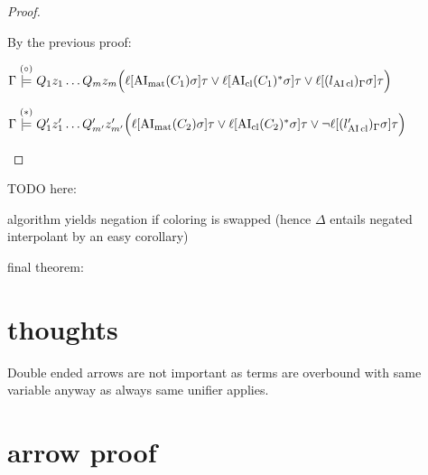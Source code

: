 \documentclass[,%
	paper=a4,%
	DIV12, %
	twoside=false,%
	liststotoc,
	bibtotoc,
	draft=false,%
	numbers=noendperiod
]{scrartcl}
\begin{document}
\begin{proof}
\begin{description}
			\clearpage
			By the previous proof:

			$\Gamma \stackrel{(\circ)}{\models} Q_1 z_1 \dots Q_m z_m \Big(\ell[\operatorname{AI}_\mathrm{mat}(C_1)\sigma]\tau \lor \ell[\operatorname{AI}_\mathrm{cl}(C_1)^*\sigma]\tau \lor \ell[(l{_{\operatorname{AI}\mathrm{cl}}})_\Gamma\sigma]\tau \Big)$

	$\Gamma \stackrel{(*)}{\models} Q_1' z_1' \dots Q_{m'}' z_{m'}' \Big(  \ell[\operatorname{AI}_\mathrm{mat}(C_2)\sigma]\tau \lor \ell[\operatorname{AI}_\mathrm{cl}(C_2)^*\sigma]\tau \lor \lnot \ell[(l{_{\operatorname{AI}\mathrm{cl}}'})_\Gamma\sigma]\tau \Big)$

	\end{description}
\end{proof}

TODO here:

algorithm yields negation if coloring is swapped (hence $\Delta$ entails negated interpolant by an easy corollary)

final theorem:








\clearpage
\section{thoughts}

\begin{conj}
	Double ended arrows are not important as terms are overbound with same variable anyway as always same unifier applies.
\end{conj}

\clearpage
\section{arrow proof}
\end{document}
